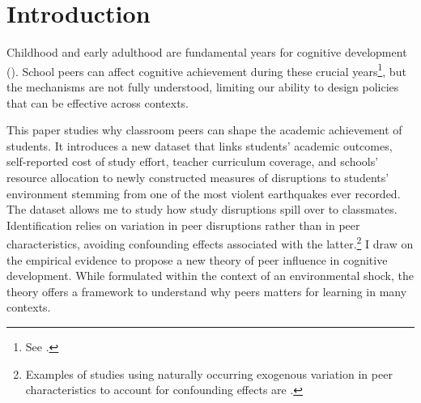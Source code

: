 
\section{Introduction}

Childhood and early adulthood are fundamental years for cognitive development (\cite*{cunha2006interpreting}). School peers can affect cognitive achievement during these crucial years\footnote{See \cite*{ammermueller2009peer,arcidiacono2012estimating,booij2017ability,carrell2013natural,duflo2011peer,garlick2018academic,hanushek2003does,hoxby2000peer,imberman2012katrina,lyle2009effects,sacerdote2001peer}.}, but the mechanisms are not fully understood, limiting our ability to design policies that can be effective across contexts. \par 
This paper studies why classroom peers can shape the academic achievement of students. It introduces a new dataset that links students' academic outcomes, self-reported cost of study effort, teacher curriculum coverage, and schools' resource allocation to newly constructed measures of disruptions to students' environment stemming from one of the most violent earthquakes ever recorded. The dataset allows me to study how study disruptions spill over to classmates. Identification relies on variation in peer disruptions rather than in peer characteristics, avoiding confounding effects associated with the latter.\footnote{Examples of studies using naturally occurring exogenous variation in peer characteristics to account for confounding effects are \cite{hoxby2000peer, angrist2004does,hoxby2005taking,lavy2012inside,imberman2012katrina}.} I draw on the empirical evidence to propose a new theory of peer influence in cognitive development. While formulated within the context of an environmental shock, the theory offers a framework to understand why peers matters for learning in many contexts.\par 



